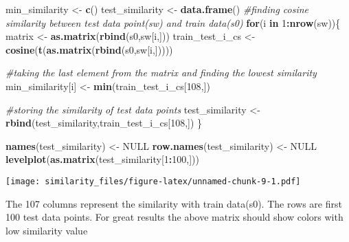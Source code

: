 \documentclass[]{article}
\newenvironment{Shaded}{\begin{snugshade}}{\end{snugshade}}
\newcommand{\KeywordTok}[1]{\textcolor[rgb]{0.13,0.29,0.53}{\textbf{#1}}}
\newcommand{\DecValTok}[1]{\textcolor[rgb]{0.00,0.00,0.81}{#1}}
\newcommand{\StringTok}[1]{\textcolor[rgb]{0.31,0.60,0.02}{#1}}
\newcommand{\CommentTok}[1]{\textcolor[rgb]{0.56,0.35,0.01}{\textit{#1}}}
\newcommand{\OtherTok}[1]{\textcolor[rgb]{0.56,0.35,0.01}{#1}}
\newcommand{\ControlFlowTok}[1]{\textcolor[rgb]{0.13,0.29,0.53}{\textbf{#1}}}
\newcommand{\OperatorTok}[1]{\textcolor[rgb]{0.81,0.36,0.00}{\textbf{#1}}}
\newcommand{\NormalTok}[1]{#1}
\begin{document}
\begin{Shaded}
\begin{Highlighting}[]
\NormalTok{min_similarity <-}\StringTok{ }\KeywordTok{c}\NormalTok{()}
\NormalTok{test_similarity <-}\StringTok{ }\KeywordTok{data.frame}\NormalTok{()}
\CommentTok{#finding cosine similarity between test data point(sw) and train data(s0)}
\ControlFlowTok{for}\NormalTok{(i }\ControlFlowTok{in} \DecValTok{1}\OperatorTok{:}\KeywordTok{nrow}\NormalTok{(sw))\{}
\NormalTok{  matrix <-}\StringTok{ }\KeywordTok{as.matrix}\NormalTok{(}\KeywordTok{rbind}\NormalTok{(s0,sw[i,]))}
\NormalTok{  train_test_i_cs <-}\StringTok{ }\KeywordTok{cosine}\NormalTok{(}\KeywordTok{t}\NormalTok{(}\KeywordTok{as.matrix}\NormalTok{(}\KeywordTok{rbind}\NormalTok{(s0,sw[i,]))))}

  \CommentTok{#taking the last element from the matrix and finding the lowest similarity}
\NormalTok{  min_similarity[i] <-}\StringTok{ }\KeywordTok{min}\NormalTok{(train_test_i_cs[}\DecValTok{108}\NormalTok{,])}
  
  \CommentTok{#storing the similarity of test data points}
\NormalTok{  test_similarity <-}\StringTok{ }\KeywordTok{rbind}\NormalTok{(test_similarity,train_test_i_cs[}\DecValTok{108}\NormalTok{,])}
\NormalTok{\} }
\end{Highlighting}
\end{Shaded}

\begin{Shaded}
\begin{Highlighting}[]
\KeywordTok{names}\NormalTok{(test_similarity) <-}\StringTok{ }\OtherTok{NULL}
\KeywordTok{row.names}\NormalTok{(test_similarity) <-}\StringTok{ }\OtherTok{NULL}
\KeywordTok{levelplot}\NormalTok{(}\KeywordTok{as.matrix}\NormalTok{(test_similarity[}\DecValTok{1}\OperatorTok{:}\DecValTok{100}\NormalTok{,]))}
\end{Highlighting}
\end{Shaded}

\texttt{[image: similarity\_files/figure-latex/unnamed-chunk-9-1.pdf]}

The 107 columns represent the similarity with train data(s0). The rows
are first 100 test data points. For great results the above matrix
should show colors with low similarity value
\end{document}
